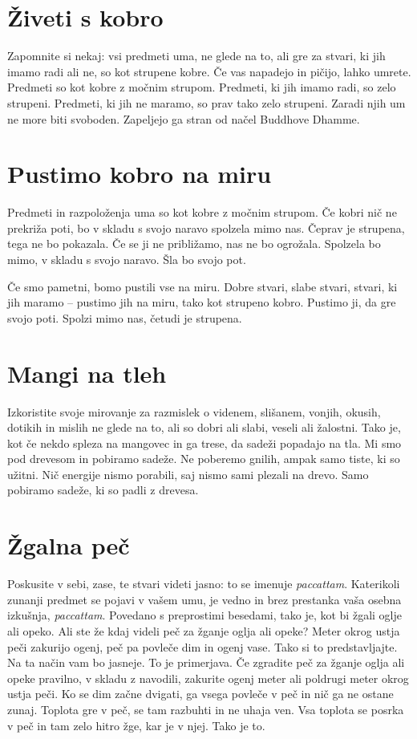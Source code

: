 \section{Živeti s kobro}

Zapomnite si nekaj: vsi predmeti uma, ne glede na to, ali gre za stvari, ki jih imamo radi ali ne, so kot strupene kobre. Če vas napadejo in pičijo, lahko umrete. Predmeti so kot kobre z močnim strupom. Predmeti, ki jih imamo radi, so zelo strupeni. Predmeti, ki jih ne maramo, so prav tako zelo strupeni. Zaradi njih um ne more biti svoboden. Zapeljejo ga stran od načel Buddhove Dhamme.

\section{Pustimo kobro na miru}

Predmeti in razpoloženja uma so kot kobre z močnim strupom. Če kobri nič ne prekriža poti, bo v skladu s svojo naravo spolzela mimo nas. Čeprav je strupena, tega ne bo pokazala. Če se ji ne približamo, nas ne bo ogrožala. Spolzela bo mimo, v skladu s svojo naravo. Šla bo svojo pot.

Če smo pametni, bomo pustili vse na miru. Dobre stvari, slabe stvari, stvari, ki jih maramo – pustimo jih na miru, tako kot strupeno kobro. Pustimo ji, da gre svojo poti. Spolzi mimo nas, četudi je strupena.

\section{Mangi na tleh}

Izkoristite svoje mirovanje za razmislek o videnem, slišanem, vonjih, okusih, dotikih in mislih ne glede na to, ali so dobri ali slabi, veseli ali žalostni. Tako je, kot če nekdo spleza na mangovec in ga trese, da sadeži popadajo na tla. Mi smo pod drevesom in pobiramo sadeže. Ne poberemo gnilih, ampak samo tiste, ki so užitni. Nič energije nismo porabili, saj nismo sami plezali na drevo. Samo pobiramo sadeže, ki so padli z drevesa.

\section{Žgalna peč}

Poskusite v sebi, zase, te stvari videti jasno: to se imenuje \emph{paccattam}. Katerikoli zunanji predmet se pojavi v vašem umu, je vedno in brez prestanka vaša osebna izkušnja, \emph{paccattam}. Povedano s preprostimi besedami, tako je, kot bi žgali oglje ali opeko. Ali ste že kdaj videli peč za žganje oglja ali opeke? Meter okrog ustja peči zakurijo ogenj, peč pa povleče dim in ogenj vase. Tako si to predstavljajte. Na ta način vam bo jasneje. To je primerjava. Če zgradite peč za žganje oglja ali opeke pravilno, v skladu z navodili, zakurite ogenj meter ali poldrugi meter okrog ustja peči. Ko se dim začne dvigati, ga vsega povleče v peč in nič ga ne ostane zunaj. Toplota gre v peč, se tam razbuhti in ne uhaja ven. Vsa toplota se posrka v peč in tam zelo hitro žge, kar je v njej. Tako je to.


